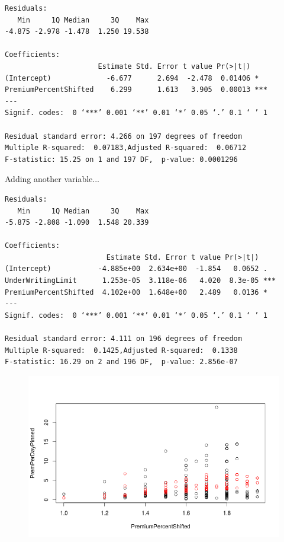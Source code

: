 \documentclass{article}
\begin{document}
\begin{verbatim}
Residuals:
   Min     1Q Median     3Q    Max 
-4.875 -2.978 -1.478  1.250 19.538 

Coefficients:
                      Estimate Std. Error t value Pr(>|t|)    
(Intercept)             -6.677      2.694  -2.478  0.01406 *  
PremiumPercentShifted    6.299      1.613   3.905  0.00013 ***
---
Signif. codes:  0 ‘***’ 0.001 ‘**’ 0.01 ‘*’ 0.05 ‘.’ 0.1 ‘ ’ 1

Residual standard error: 4.266 on 197 degrees of freedom
Multiple R-squared:  0.07183,Adjusted R-squared:  0.06712 
F-statistic: 15.25 on 1 and 197 DF,  p-value: 0.0001296
\end{verbatim}

Adding another variable...\\

\begin{center}
\begin{verbatim}
Residuals:
   Min     1Q Median     3Q    Max 
-5.875 -2.808 -1.090  1.548 20.339 

Coefficients:
                        Estimate Std. Error t value Pr(>|t|)    
(Intercept)           -4.885e+00  2.634e+00  -1.854   0.0652 .  
UnderWritingLimit      1.253e-05  3.118e-06   4.020  8.3e-05 ***
PremiumPercentShifted  4.102e+00  1.648e+00   2.489   0.0136 *  
---
Signif. codes:  0 ‘***’ 0.001 ‘**’ 0.01 ‘*’ 0.05 ‘.’ 0.1 ‘ ’ 1

Residual standard error: 4.111 on 196 degrees of freedom
Multiple R-squared:  0.1425,Adjusted R-squared:  0.1338 
F-statistic: 16.29 on 2 and 196 DF,  p-value: 2.856e-07
\end{verbatim}
\end{center}

\begin{figure}[b]
\centering
\includegraphics[width=0.45\paperwidth]{pinnedPremPerDayWithUWL.png}
\end{figure}
\end{document}
